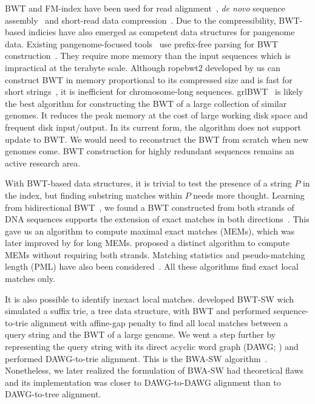 \documentclass[webpdf,contemporary,large,namedate]{oup-authoring-template}%
\begin{document}
BWT and FM-index have been used for read alignment~\citep{Langmead:2009aa,Li:2009uq,Li:2009aa},
\emph{de novo} sequence assembly~\citep{Simpson:2012aa} and short-read data compression~\citep{Cox:2012ly}.
Due to the compressibility, BWT-based indicies have also emerged as competent data structures for pangenome data.
Existing pangenome-focused tools~\citep{Rossi:2022aa,Ahmed:2021aa,Zakeri:2024aa}
use prefix-free parsing for BWT construction~\citep{Boucher:2019aa}.
They require more memory than the input sequences which is impractical at the terabyte scale.
Although ropebwt2 developed by us can construct BWT in memory proportional to its compressed size and is fast for short strings~\citep{Li:2014ab},
it is inefficient for chromosome-long sequences.
grlBWT~\citep{DBLP:journals/iandc/DiazDominguezN23} is likely the best algorithm for constructing the BWT of a large collection of similar genomes.
It reduces the peak memory at the cost of large working disk space and frequent disk input/output.
In its current form, the algorithm does not support update to BWT.
We would need to reconstruct the BWT from scratch when new genomes come.
BWT construction for highly redundant sequences remains an active research area.

With BWT-based data structures, it is trivial to test the presence of a string $P$ in the index,
but finding substring matches within $P$ needs more thought.
Learning from bidirectional BWT~\citep{DBLP:conf/bibm/LamLTWWY09},
we found a BWT constructed from both strands of DNA sequences supports the extension of exact matches in both directions~\citep{Li:2012fk}.
This gave us an algorithm to compute maximal exact matches (MEMs), which was later improved by \citet{DBLP:conf/dlt/Gagie24} for long MEMs.
\citet{DBLP:journals/tcs/BannaiGI20} proposed a distinct algorithm to compute MEMs without requiring both strands.
Matching statistics and pseudo-matching length (PML) have also been considered~\citep{Ahmed:2021aa}.
All these algorithms find exact local matches only.

It is also possible to identify inexact local matches.
\citet{Lam:2008aa} developed BWT-SW wich simulated a suffix trie, a tree data structure, with BWT
and performed sequence-to-trie alignment with affine-gap penalty to find all local matches
between a query string and the BWT of a large genome.
We went a step further by representing the query string with its direct acyclic word graph (DAWG; \citealt*{DBLP:journals/eatcs/BlumerBEHM83})
and performed DAWG-to-trie alignment.
This is the BWA-SW algorithm~\citep{Li:2010fk}.
Nonetheless, we later realized the formulation of BWA-SW had theoretical flaws
and its implementation was closer to DAWG-to-DAWG alignment than to DAWG-to-tree alignment.
\end{document}

